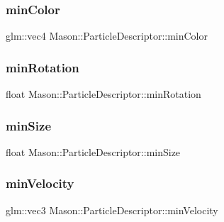\hypertarget{class_mason_1_1_particle_descriptor_a86b3ee8f533d314ed0f0e48228144a25}{}\label{class_mason_1_1_particle_descriptor_a86b3ee8f533d314ed0f0e48228144a25} 
\subsubsection{\texorpdfstring{min\+Color}{minColor}}
{\footnotesize\ttfamily glm\+::vec4 Mason\+::\+Particle\+Descriptor\+::min\+Color}

\hypertarget{class_mason_1_1_particle_descriptor_a086f4988188e22f066e93529cb02608c}{}\label{class_mason_1_1_particle_descriptor_a086f4988188e22f066e93529cb02608c} 
\subsubsection{\texorpdfstring{min\+Rotation}{minRotation}}
{\footnotesize\ttfamily float Mason\+::\+Particle\+Descriptor\+::min\+Rotation}

\hypertarget{class_mason_1_1_particle_descriptor_a5bbc1147b832c903cee0b6ebe964d8c3}{}\label{class_mason_1_1_particle_descriptor_a5bbc1147b832c903cee0b6ebe964d8c3} 
\subsubsection{\texorpdfstring{min\+Size}{minSize}}
{\footnotesize\ttfamily float Mason\+::\+Particle\+Descriptor\+::min\+Size}

\hypertarget{class_mason_1_1_particle_descriptor_a6412dbc10bc67e2e8b21faef1c050a67}{}\label{class_mason_1_1_particle_descriptor_a6412dbc10bc67e2e8b21faef1c050a67} 
\subsubsection{\texorpdfstring{min\+Velocity}{minVelocity}}
{\footnotesize\ttfamily glm\+::vec3 Mason\+::\+Particle\+Descriptor\+::min\+Velocity}

